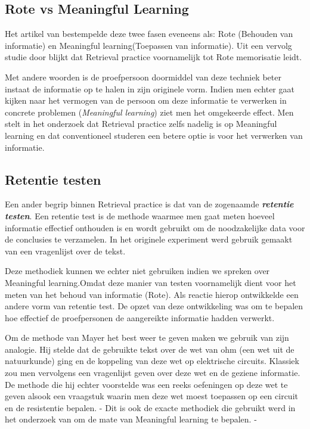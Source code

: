 \documentclass{hogent-article}
\newcommand{\boldit}[1]{\emph{\textbf{#1}}}
\begin{document}
\subsection{Rote vs Meaningful Learning}
\label{RoteVSMeaningful}
Het artikel van \textcite{Mayer_2002} bestempelde deze twee fasen eveneens als: Rote (Behouden van informatie) en Meaningful learning(Toepassen van informatie). Uit een vervolg studie door \textcite{van_Gog_2012} blijkt dat Retrieval practice voornamelijk tot Rote memorisatie leidt.\\

\par
\noindent
Met andere woorden is de proefpersoon doormiddel van deze techniek beter instaat de informatie op te halen in zijn originele vorm. Indien men echter gaat kijken naar het vermogen van de persoon om deze informatie te verwerken in concrete problemen (\textit{Meaningful learning}) ziet men het omgekeerde effect. Men stelt in het onderzoek dat Retrieval practice zelfs nadelig is op Meaningful learning en dat conventioneel studeren een betere optie is voor het verwerken van informatie.\\
\par
\noindent

\subsection{Retentie testen}
\label{RT}
Een ander begrip binnen Retrieval practice is dat van de zogenaamde \boldit{retentie testen}. Een retentie test is de methode waarmee men gaat meten hoeveel informatie effectief onthouden is en wordt gebruikt om de noodzakelijke data voor de conclusies te verzamelen. In het originele experiment \textcite{Roediger_2006} werd gebruik gemaakt van een vragenlijst over de tekst.\\

\par
\noindent
Deze methodiek kunnen we echter niet gebruiken indien we spreken over Meaningful learning.Omdat deze manier van testen voornamelijk dient voor het meten van het behoud van informatie (Rote). Als reactie hierop ontwikkelde \textcite{Mayer_2002} een andere vorm van retentie test. De opzet van deze ontwikkeling was om te bepalen hoe effectief de proefpersonen de aangereikte informatie hadden verwerkt.\\
\par
\noindent
Om de methode van Mayer het best weer te geven maken we gebruik van zijn analogie. Hij stelde dat de gebruikte tekst over de wet van ohm (een wet uit de natuurkunde) ging en de koppeling van deze wet op elektrische circuits. Klassiek zou men vervolgens een vragenlijst geven over deze wet en de geziene informatie. De methode die hij echter voorstelde was een reeks oefeningen op deze wet te geven alsook een vraagstuk waarin men deze wet moest toepassen op een circuit en de resistentie bepalen. - Dit is ook de exacte methodiek die gebruikt werd in het onderzoek van \textcite{van_Gog_2012} om de mate van Meaningful learning te bepalen. -
\end{document}
